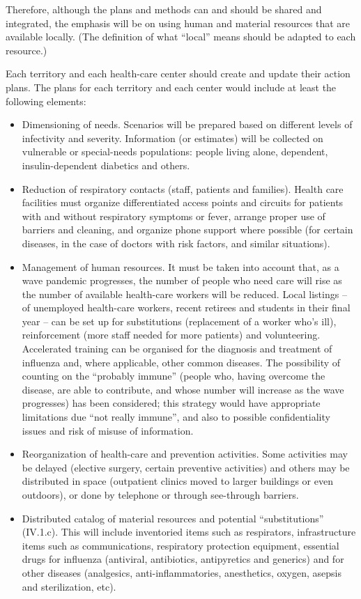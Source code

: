 \documentclass[12pt, a4]{scrartcl}
\begin{document}
Therefore, although the plans and methods can and should be shared and integrated, the emphasis will be on using human and material resources that are available locally. (The definition of what “local” means should be adapted to each resource.)

Each territory and each health-care center should create and update their action plans. The plans for each territory and each center would include at least the following elements:
\begin{itemize}
	\item Dimensioning of needs. Scenarios will be prepared based on different levels of infectivity and severity. Information (or estimates) will be collected on vulnerable or special-needs populations: people living alone, dependent, insulin-dependent diabetics and others.
	\item Reduction of respiratory contacts (staff, patients and families). Health care facilities must organize differentiated access points and circuits for patients with and without respiratory symptoms or fever, arrange proper use of barriers and cleaning, and organize phone support where possible (for certain diseases, in the case of doctors with risk factors, and similar situations).
	\item Management of human resources. It must be taken into account that, as a wave pandemic progresses, the number of people who need care will rise as the number of available health-care workers will be reduced. Local listings – of unemployed health-care workers, recent retirees and students in their final year – can be set up for substitutions (replacement of a worker who's ill), reinforcement (more staff needed for more patients) and volunteering. Accelerated training can be organised for the diagnosis and treatment of influenza and, where applicable, other common diseases. The possibility of counting on the “probably immune” (people who, having overcome the disease, are able to contribute, and whose number will increase as the wave progresses) has been considered; this strategy would have appropriate limitations due “not really immune”, and also to possible confidentiality issues and risk of misuse of information.
	\item Reorganization of health-care and prevention activities. Some activities may be delayed (elective surgery, certain preventive activities) and others may be distributed in space (outpatient clinics moved to larger buildings or even outdoors), or done by telephone or through see-through barriers.
	\item Distributed catalog of material resources and potential “substitutions” (IV.1.c). This will include inventoried items such as respirators, infrastructure items such as communications, respiratory protection equipment, essential drugs for influenza (antiviral, antibiotics, antipyretics and generics) and for other diseases (analgesics, anti-inflammatories, anesthetics, oxygen, asepsis and sterilization, etc). 

\end{itemize}
\end{document}
